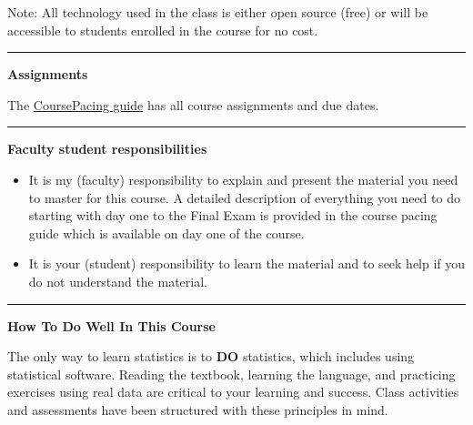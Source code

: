 \documentclass[
]{article}
\begin{document}
Note: All technology used in the class is either open source (free) or
will be accessible to students enrolled in the course for no cost.

\begin{center}\rule{0.5\linewidth}{0.5pt}\end{center}

\textbf{Assignments}

The \href{../CoursePacing/CoursePacingS2024.html}{CoursePacing guide}
has all course assignments and due dates.

\begin{center}\rule{0.5\linewidth}{0.5pt}\end{center}

\begin{rmdnote}
\textbf{Faculty student responsibilities}

\begin{itemize}
\item
  It is my (faculty) responsibility to explain and present the material
  you need to master for this course. A detailed description of
  everything you need to do starting with day one to the Final Exam is
  provided in the course pacing guide which is available on day one of
  the course.
\item
  It is your (student) responsibility to learn the material and to seek
  help if you do not understand the material.
\end{itemize}
\end{rmdnote}

\begin{center}\rule{0.5\linewidth}{0.5pt}\end{center}

\textbf{How To Do Well In This Course}

The only way to learn statistics is to \textbf{DO} statistics, which
includes using statistical software. Reading the textbook, learning the
language, and practicing exercises using real data are critical to your
learning and success. Class activities and assessments have been
structured with these principles in mind.
\end{document}
